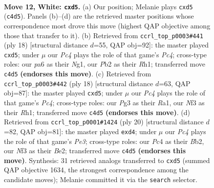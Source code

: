 \documentclass[11pt]{article}
\begin{document}
\clearpage

\begin{figure}[p]\centering
\begin{subfigure}{0.46\textwidth}\centering
\resizebox{\linewidth}{!}{%
\newchessgame
\chessboard[
  setfen={r1bn1r1k/1pppqppp/p4n2/3p4/2P5/2B1PNP1/PP3PBP/R2Q1RK1 w - - 0 12},
  showmover=false,
  pgfstyle=straightmove, color=movearrow, markmove={c4-d5}
]}
\caption{}
\end{subfigure}\hfill
\begin{subfigure}{0.46\textwidth}\centering
\resizebox{\linewidth}{!}{%
\newchessgame
\chessboard[
  setfen={rnb2rk1/pp1pqppp/5n2/3p4/2P1p3/P1B3P1/1P2PPBP/R2QK1NR w KQ - 0 10},
  showmover=false,
  pgfstyle=straightmove, color=movearrow, markmove={c4-d5}
]}
\caption{}
\end{subfigure}
\\[4pt]
\begin{subfigure}{0.46\textwidth}\centering
\resizebox{\linewidth}{!}{%
\newchessgame
\chessboard[
  setfen={rnb2rk1/pp1pqppp/5n2/3p4/2P1p3/P1B3PN/1P2PP1P/R2QKB1R w KQ - 0 10},
  showmover=false,
  pgfstyle=straightmove, color=movearrow, markmove={c4-d5}
]}
\caption{}
\end{subfigure}\hfill
\begin{subfigure}{0.46\textwidth}\centering
\resizebox{\linewidth}{!}{%
\newchessgame
\chessboard[
  setfen={r1b2rk1/pp1pqppp/2n2n2/4p3/2Pp4/1P2PN2/PB2BPPP/R2QK2R w KQ - 0 11},
  showmover=false,
  pgfstyle=straightmove, color=movearrow, markmove={e3-d4}
]}
\caption{}
\end{subfigure}
\caption{\textbf{Move 12, White: \texttt{cxd5}.} (a) Our position; Melanie plays \texttt{cxd5} (\texttt{c4d5}). Panels (b)--(d) are the retrieved master positions whose correspondence most drove this move (highest QAP objective among those that transfer to it). (b) Retrieved from \texttt{ccrl\_top\_p0003\#441} (ply 18) [structural distance $d$=55, QAP obj=92]: the master played \texttt{cxd5}; under $\mu$ our \emph{Pc4} plays the role of that game's \emph{Pc4}; cross-type roles: our \emph{p}a6 as their \emph{N}g1, our \emph{P}b2 as their \emph{R}h1; transferred move \texttt{c4d5} \textbf{(endorses this move)}. (c) Retrieved from \texttt{ccrl\_top\_p0003\#442} (ply 18) [structural distance $d$=63, QAP obj=87]: the master played \texttt{cxd5}; under $\mu$ our \emph{Pc4} plays the role of that game's \emph{Pc4}; cross-type roles: our \emph{P}g3 as their \emph{R}a1, our \emph{N}f3 as their \emph{R}h1; transferred move \texttt{c4d5} \textbf{(endorses this move)}. (d) Retrieved from \texttt{ccrl\_top\_p0001\#1424} (ply 20) [structural distance $d$=82, QAP obj=81]: the master played \texttt{exd4}; under $\mu$ our \emph{Pc4} plays the role of that game's \emph{Pe3}; cross-type roles: our \emph{P}c4 as their \emph{B}b2, our \emph{N}f3 as their \emph{B}e2; transferred move \texttt{c4d5} \textbf{(endorses this move)}. Synthesis: 31 retrieved analogs transferred to \texttt{cxd5} (summed QAP objective 1634, the strongest correspondence among the candidate moves); Melanie committed it via the \texttt{search} selector.}
\label{fig:thought-m22}
\end{figure}
\end{document}
